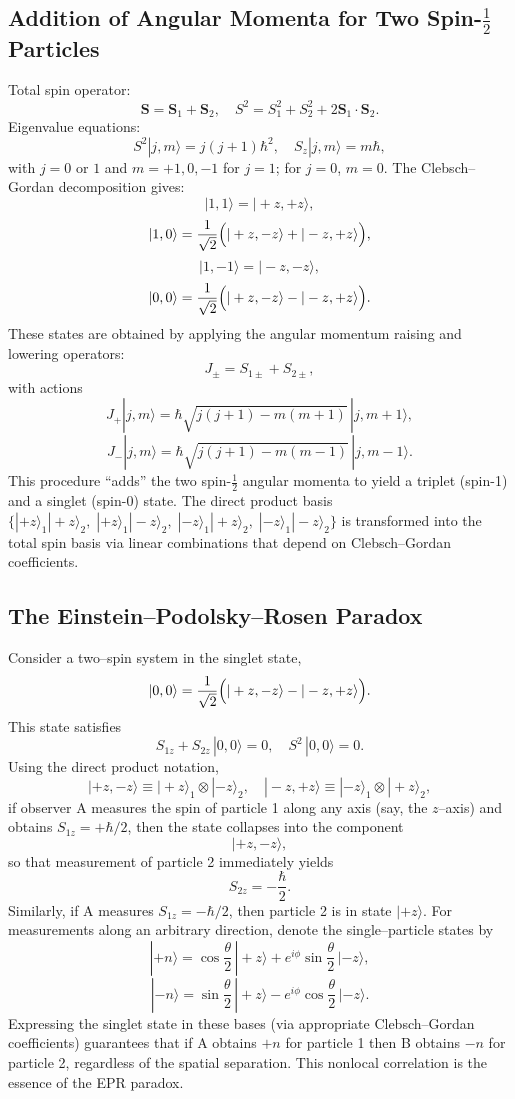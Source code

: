 \documentclass[twocolumn]{article}
\begin{document}
\begin{spacing}{1}
\subsection{Addition of Angular Momenta for Two Spin-\(\frac{1}{2}\) Particles}
Total spin operator:
\[
\mathbf{S}=\mathbf{S}_1+\mathbf{S}_2,\quad S^2=S_1^2+S_2^2+2\mathbf{S}_1\cdot\mathbf{S}_2.
\]
Eigenvalue equations:
\[
S^2|j,m\rangle=j(j+1)\hbar^2,\quad S_z|j,m\rangle=m\hbar,
\]
with \(j=0\) or \(1\) and \(m=+1,0,-1\) for \(j=1\); for \(j=0\), \(m=0\). The Clebsch–Gordan decomposition gives:
\[
|1,1\rangle=|+z,+z\rangle,
\]
\[
|1,0\rangle=\frac{1}{\sqrt{2}}\Bigl(|+z,-z\rangle+|-z,+z\rangle\Bigr),
\]
\[
|1,-1\rangle=|-z,-z\rangle,
\]
\[
|0,0\rangle=\frac{1}{\sqrt{2}}\Bigl(|+z,-z\rangle-|-z,+z\rangle\Bigr).
\]
These states are obtained by applying the angular momentum raising and lowering operators:
\[
J_{\pm}=S_{1\pm}+S_{2\pm},
\]
with actions
\[
J_{+}|j,m\rangle=\hbar\sqrt{j(j+1)-m(m+1)}\,|j,m+1\rangle,\]
\[
J_{-}|j,m\rangle=\hbar\sqrt{j(j+1)-m(m-1)}\,|j,m-1\rangle.
\]
This procedure “adds” the two spin-\(\frac{1}{2}\) angular momenta to yield a triplet (spin-1) and a singlet (spin-0) state. The direct product basis \(\{|+z\rangle_1|+z\rangle_2,\;|+z\rangle_1|-z\rangle_2,\;|-z\rangle_1|+z\rangle_2,\;|-z\rangle_1|-z\rangle_2\}\) is transformed into the total spin basis via linear combinations that depend on Clebsch–Gordan coefficients.

\subsection{The Einstein–Podolsky–Rosen Paradox}
Consider a two–spin system in the singlet state,
\[
|0,0\rangle=\frac{1}{\sqrt{2}}\Bigl(|+z,-z\rangle - |-z,+z\rangle\Bigr).
\]
This state satisfies
\[
S_{1z}+S_{2z}\,|0,0\rangle=0,\quad S^2\,|0,0\rangle=0.
\]
Using the direct product notation,
\[
|+z,-z\rangle\equiv |+z\rangle_1\otimes|-z\rangle_2,\quad
|-z,+z\rangle\equiv |-z\rangle_1\otimes|+z\rangle_2,
\]
if observer A measures the spin of particle 1 along any axis (say, the \(z\)–axis) and obtains \(S_{1z}=+\hbar/2\), then the state collapses into the component
\[
|+z,-z\rangle,
\]
so that measurement of particle 2 immediately yields
\[
S_{2z}=-\frac{\hbar}{2}.
\]
Similarly, if A measures \(S_{1z}=-\hbar/2\), then particle 2 is in state \(|+z\rangle\). For measurements along an arbitrary direction, denote the single–particle states by
\[
|+n\rangle=\cos\frac{\theta}{2}\,|+z\rangle+e^{i\phi}\sin\frac{\theta}{2}\,|-z\rangle,
\]
\[
|-n\rangle=\sin\frac{\theta}{2}\,|+z\rangle-e^{i\phi}\cos\frac{\theta}{2}\,|-z\rangle.
\]
Expressing the singlet state in these bases (via appropriate Clebsch–Gordan coefficients) guarantees that if A obtains \(+n\) for particle 1 then B obtains \(-n\) for particle 2, regardless of the spatial separation. This nonlocal correlation is the essence of the EPR paradox.


\end{spacing}
\end{document}
